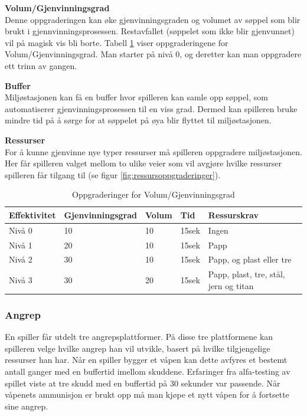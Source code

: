 \begin{description}
	\item \textbf{Volum/Gjenvinningsgrad}\\
		Denne oppgraderingen kan øke gjenvinningsgraden og volumet av
søppel som blir brukt i gjennvinningsprosessen. Restavfallet (søppelet
som ikke blir gjenvunnet) vil på magisk vis bli borte. Tabell
\ref{tab:effektivitet} viser oppgraderingene for Volum/Gjenvinningsgrad.
Man starter på nivå 0, og deretter kan man oppgradere ett trinn av
gangen.
	\item \textbf{Buffer}\\
		Miljøstasjonen kan få en buffer hvor spilleren kan samle opp søppel, som automatiserer gjenvinningsprosessen til en viss grad. Dermed kan spilleren bruke mindre tid på å sørge for at søppelet på øya blir flyttet til miljøstasjonen.
	\item \textbf{Ressurser}\\
		For å kunne gjenvinne nye typer ressurser må spilleren oppgradere miljøstasjonen. Her får spilleren valget mellom to ulike veier som vil avgjøre hvilke ressurser spilleren får tilgang til (se figur \ref{fig:ressursoppgraderinger}).
\end{description}

\begin{table}
	\begin{tabular}[\textwidth]{ l  l  p{3cm}  l  p{4cm} }
		\hline
		\bf{Effektivitet} & \bf{Gjenvinningsgrad} & \bf{Volum} & \bf{Tid} & \bf{Ressurskrav} \\
		\hline
		Nivå 0 & 10 & 10 & 15sek & Ingen  \\
		Nivå 1 & 20 & 10 & 15sek & Papp \\
		Nivå 2 & 30 & 10 & 15sek & Papp, og plast eller tre \\
		Nivå 3 & 30 & 20 & 15sek & Papp, plast, tre, stål, jern og titan \\
		\hline
	\end{tabular}
	\caption{Oppgraderinger for Volum/Gjenvinningsgrad}
	\label{tab:effektivitet}
\end{table}


\subsubsection{Angrep}
En spiller får utdelt tre angrepsplattformer. På disse tre plattformene
kan spilleren velge hvilke angrep han vil utvikle, basert på hvilke
tilgjengelige ressurser han har. Når en spiller bygger et våpen kan dette avfyres et bestemt antall ganger med en buffertid imellom skuddene. Erfaringer fra alfa-testing av spillet viste at tre skudd med en buffertid på 30 sekunder var passende. Når våpenets ammunisjon er brukt opp må man kjøpe et nytt våpen for å fortsette sine angrep. 


